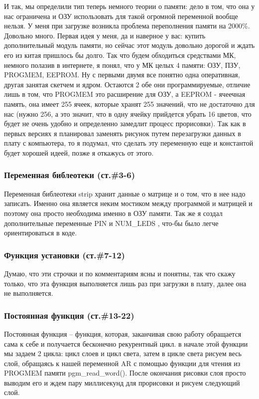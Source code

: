 \documentclass[a4paper, 12pt]{article}
\begin{document}
И так, мы определили тип теперь немного теории о памяти: дело в том, что она у
нас ограничена и ОЗУ использовать для такой огромной переменной вообще нельзя.
У меня при загрузке возникла проблема переполнения памяти на 2000\%. Довольно 
много. Первая идея у меня, да и наверное у вас: купить дополнительный модуль 
памяти, но сейчас этот модуль довольно дорогой и ждать его из китая пришлось
бы долго. Так что будем обходиться средствами МК, немного полазив в интернете,
я понял, что у МК целых 4 памяти: ОЗУ, ПЗУ, PROGMEM, EEPROM. Ну с первыми двумя
все понятно одна оперативная, другая занятая скетчем и ядром. Остаются 2
обе они программируемые, отличие лишь в том, что PROGMEM это расширение для
ОЗУ, а EEPROM - ячеечная память, она имеет 255 ячеек, которые хранят 255 
значений, что не достаточно для нас (нужно 256, а это значит, что в одну 
ячейку прийдется убрать 16 цветов, что будет не очень удобно и определенно 
замедлит процесс прорисовки). Так как в первых версиях я планировал заменять 
рисунок путем перезагрузки данных в плату с компьютера, то я подумал, что 
сделать эту переменную еще и константой будет хорошей идеей, позже я откажусь
от этого.

\subsubsection{Переменная библеотеки (ст.\#3-6)}

Переменная библеотеки strip хранит данные о матрице и о том, что в нее надо
записать. Именно она является неким мостиком между программой и матрицей и 
поэтому она просто необходима именно в ОЗУ памяти. Так же я создал 
дополнительные переменные PIN и NUM\_LEDS , что-бы было легче ориентироваться в
коде. 

\subsubsection{Функция установки (ст.\#7-12)}

Думаю, что эти строчки и по комментариям ясны и  понятны, так что скажу только,
что эта функция выполняется лишь раз при загрузки в плату, далее она не 
выполняется.

\subsubsection{Постоянная функция (ст.\#13-22)}

Постоянная функция -- функция, которая, заканчивая свою работу обращается сама 
к себе и получается бесконечно рекурентный цикл. в начале этой функции мы 
задаем 2 цикла: цикл слоев и цикл света, затем в цикле света рисуем весь слой,
обращаясь к нашей переменной AR с помощью функции для чтения из PROGMEM памяти
pgm\_read\_word(). После окончания рисовки слоя просто выводим его и ждем пару
миллисекунд для прорисовки и рисуем следующий слой.
\end{document}

